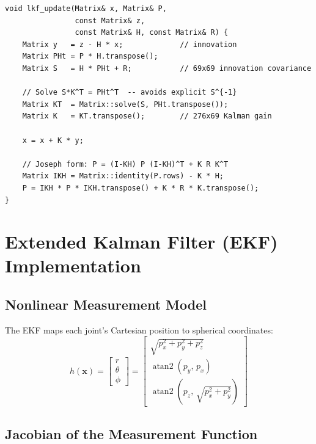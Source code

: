 \documentclass[11pt, a4paper]{article}
\begin{document}
\begin{lstlisting}[caption={LKF update with Joseph-form covariance in \texttt{lkf.cpp}}]
void lkf_update(Matrix& x, Matrix& P,
                const Matrix& z,
                const Matrix& H, const Matrix& R) {
    Matrix y   = z - H * x;             // innovation
    Matrix PHt = P * H.transpose();
    Matrix S   = H * PHt + R;           // 69x69 innovation covariance

    // Solve S*K^T = PHt^T  -- avoids explicit S^{-1}
    Matrix KT  = Matrix::solve(S, PHt.transpose());
    Matrix K   = KT.transpose();        // 276x69 Kalman gain

    x = x + K * y;

    // Joseph form: P = (I-KH) P (I-KH)^T + K R K^T
    Matrix IKH = Matrix::identity(P.rows) - K * H;
    P = IKH * P * IKH.transpose() + K * R * K.transpose();
}
\end{lstlisting}

\section{Extended Kalman Filter (EKF) Implementation}

\subsection{Nonlinear Measurement Model}

The EKF maps each joint's Cartesian position to spherical coordinates:
\begin{equation}
  h(\mathbf{x}) =
  \begin{bmatrix} r \\ \theta \\ \phi \end{bmatrix}
  =
  \begin{bmatrix}
    \sqrt{p_x^2 + p_y^2 + p_z^2} \\
    \operatorname{atan2}(p_y,\, p_x) \\
    \operatorname{atan2}\!\left(p_z,\,\sqrt{p_x^2+p_y^2}\right)
  \end{bmatrix}
\end{equation}

\subsection{Jacobian of the Measurement Function}
\end{document}
